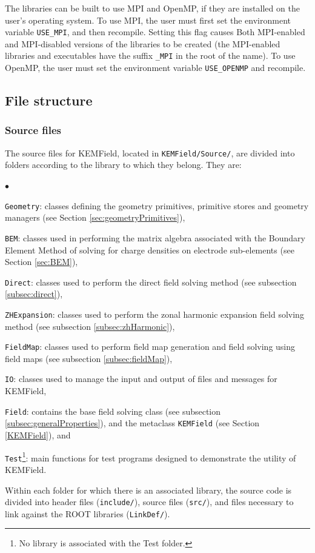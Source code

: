 \documentclass[11pt,a4paper,oneside]{article}
\newcommand{\kemfield}    {{\sc KEMField}}
\newcommand{\squishlist}{
   \begin{list}{$\bullet$}
    { \setlength{\itemsep}{0pt}      \setlength{\parsep}{3pt}
      \setlength{\topsep}{3pt}       \setlength{\partopsep}{0pt}
      \setlength{\leftmargin}{1.5em} \setlength{\labelwidth}{1em}
      \setlength{\labelsep}{0.5em} } }
\newcommand{\squishend}{
    \end{list}  }
\begin{document}
The libraries can be built to use MPI and OpenMP, if they are installed on the user's operating system.  To use MPI, the user must first set the environment variable \texttt{USE\_MPI}, and then recompile.  Setting this flag causes Both MPI-enabled and MPI-disabled versions of the libraries to be created (the MPI-enabled libraries and executables have the suffix \texttt{\_MPI} in the root of the name).  To use OpenMP, the user must set the environment variable \texttt{USE\_OPENMP} and recompile.  

\subsection{File structure}
\label{subsec:fileStructure}

\subsubsection{Source files}
\label{subsubsec:source}

The source files for \kemfield, located in \texttt{KEMField/Source/}, are divided into folders according to the library to which they belong.  They are:
%
\squishlist
\item \texttt{Geometry}: classes defining the geometry primitives, primitive stores and geometry managers (see Section \ref{sec:geometryPrimitives}),
\item \texttt{BEM}: classes used in performing the matrix algebra associated with the Boundary Element Method of solving for charge densities on electrode sub-elements (see Section \ref{sec:BEM}),
\item \texttt{Direct}: classes used to perform the direct field solving method (see subsection \ref{subsec:direct}),
\item \texttt{ZHExpansion}: classes used to perform the zonal harmonic expansion field solving method (see subsection \ref{subsec:zhHarmonic}),
\item \texttt{FieldMap}: classes used to perform field map generation and field solving using field maps (see subsection \ref{subsec:fieldMap}),
\item \texttt{IO}: classes used to manage the input and output of files and messages for \kemfield,
\item \texttt{Field}: contains the base field solving class (see subsection \ref{subsec:generalProperties}), and the metaclass \texttt{KEMField} (see Section \ref{KEMField}), and
\item \texttt{Test}\footnote{No library is associated with the Test folder.}: main functions for test programs designed to demonstrate the utility of \kemfield.
\squishend
%
Within each folder for which there is an associated library, the source code is divided into header files (\texttt{include/}), source files (\texttt{src/}), and files necessary to link against the ROOT libraries (\texttt{LinkDef/}).  
\end{document}
